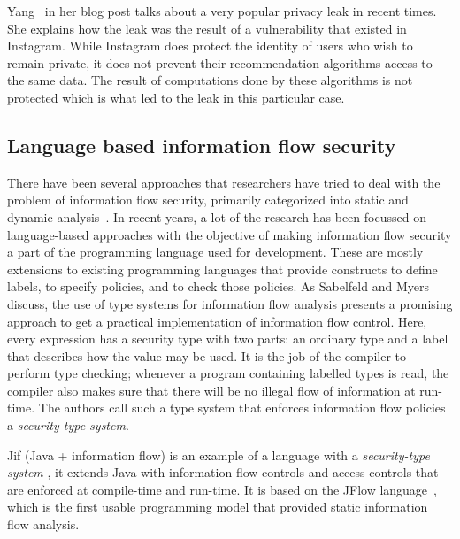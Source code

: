 Yang~\cite{comey} in her blog post talks about a very popular privacy leak in recent
times. She explains how the leak was the result of a vulnerability that existed in
Instagram. While Instagram does protect the identity of users who wish to remain
private, it does not prevent their recommendation algorithms access to the same
data. The result of computations done by these algorithms is not protected which
is what led to the leak in this particular case.


\subsection{Language based information flow security \label{subsec:langinfo}}
There have been several approaches that researchers have tried to deal with the
problem of information flow security, primarily categorized into static and dynamic
analysis~\cite{Russo, Chlipala}. In recent years, a lot of the research has been
focussed on language-based approaches with the objective of making information
flow security a part of the programming language used for development. These are
mostly extensions to existing programming languages that provide constructs to define
labels, to specify policies, and to check those policies. As Sabelfeld and Myers~\cite{LangInfo}
discuss, the use of type systems for information flow analysis presents a promising
approach to get a practical implementation of information flow control. Here, every
expression has a security type with two parts: an ordinary type and a label that
describes how the value may be used. It is the job of the compiler to perform type
checking; whenever a program containing labelled types is read, the compiler also
makes sure that there will be no illegal flow of information at run-time. The authors
call such a type system that enforces information flow policies a \textit{security-type
system}.

Jif (Java + information flow) is an example of a language with a \textit{security-type system}
\cite{jifurl}, it extends Java with information flow controls and access controls
that are enforced at compile-time and run-time. It is based on the JFlow
language~\cite{Jflow}, which is the first usable programming model that provided
static information flow analysis.

